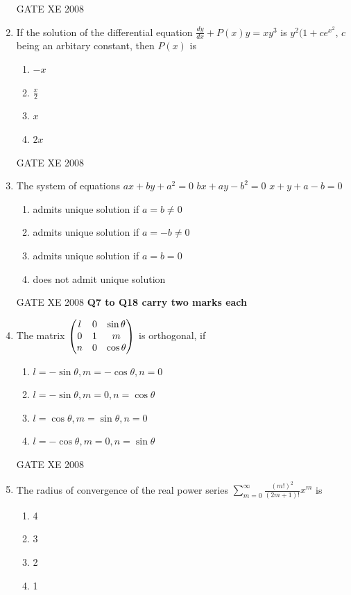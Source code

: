 \documentclass[12pt]{article}
\begin{document}
\begin{enumerate}[label=Q\arabic*.]
GATE XE 2008
\item If the solution of the differential equation $\frac{dy}{dx} + P(x)y = xy^3$ is $y^2(1+ce^{x^2}$, $c$ being an arbitary constant, then $P(x)$ is

\begin{enumerate}[label=(\Alph*)]
\item  $-x$
\item  $\frac{x}{2}$
\item  $x$
\item $2x$
\end{enumerate}

GATE XE 2008
\item The system of equations \newline $ax+by+a^2=0$ \newline $bx+ay-b^2=0$ \newline $x+y+a-b=0$

\begin{enumerate}[label=(\Alph*)]
\item  admits unique solution if $a=b\not =0$
\item admits unique solution if $a=-b\not=0$
\item admits unique solution if $a=b=0$
\item does not admit unique solution
\end{enumerate}

GATE XE 2008\newline
\textbf{Q7 to Q18 carry two marks each}
\item The matrix $\begin{pmatrix}l&0&\sin\theta\\0&1&m\\n&0&\cos\theta\end{pmatrix}$ is orthogonal, if

\begin{enumerate}[label=(\Alph*)]
\item $l=-\sin\theta, m=-\cos\theta, n=0$
\item $l=-\sin\theta, m=0, n=\cos\theta$
\item $l=\cos\theta, m=\sin\theta, n=0$
\item $l=-\cos\theta, m=0, n=\sin\theta$
\end{enumerate}

GATE XE 2008
\item The radius of convergence of the real power series $\sum_{m=0}^{\infty} \frac{(m!)^2}{(2m+1)!} x^m$ is

\begin{enumerate}[label=(\Alph*)]
\item 4
\item  3
\item 2
\item 1
\end{enumerate}


\end{enumerate}
\end{document}
